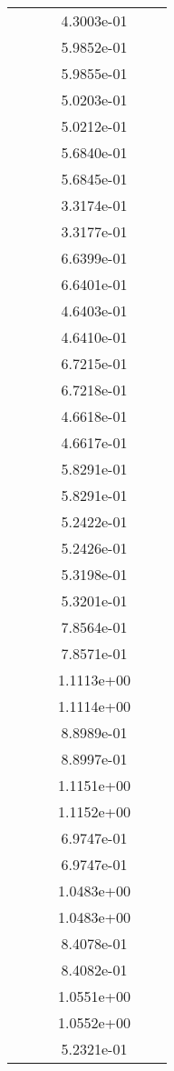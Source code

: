 \begin{xltabular}{\textwidth}{r|rS[table-format=1.3e+2]S[table-format=1.4e+2]S[table-format=1.4e+2]S[table-format=-1.5]}
&  &  & 4.3003e-01 & & \\
&  &  & 5.9852e-01 & & \\
&  &  & 5.9855e-01 & & \\
&  &  & 5.0203e-01 & & \\
&  &  & 5.0212e-01 & & \\
&  &  & 5.6840e-01 & & \\
&  &  & 5.6845e-01 & & \\
&  &  & 3.3174e-01 & & \\
&  &  & 3.3177e-01 & & \\
&  &  & 6.6399e-01 & & \\
&  &  & 6.6401e-01 & & \\
&  &  & 4.6403e-01 & & \\
&  &  & 4.6410e-01 & & \\
&  &  & 6.7215e-01 & & \\
&  &  & 6.7218e-01 & & \\
&  &  & 4.6618e-01 & & \\
&  &  & 4.6617e-01 & & \\
&  &  & 5.8291e-01 & & \\
&  &  & 5.8291e-01 & & \\
&  &  & 5.2422e-01 & & \\
&  &  & 5.2426e-01 & & \\
&  &  & 5.3198e-01 & & \\
&  &  & 5.3201e-01 & & \\
&  &  & 7.8564e-01 & & \\
&  &  & 7.8571e-01 & & \\
&  &  & 1.1113e+00 & & \\
&  &  & 1.1114e+00 & & \\
&  &  & 8.8989e-01 & & \\
&  &  & 8.8997e-01 & & \\
&  &  & 1.1151e+00 & & \\
&  &  & 1.1152e+00 & & \\
&  &  & 6.9747e-01 & & \\
&  &  & 6.9747e-01 & & \\
&  &  & 1.0483e+00 & & \\
&  &  & 1.0483e+00 & & \\
&  &  & 8.4078e-01 & & \\
&  &  & 8.4082e-01 & & \\
&  &  & 1.0551e+00 & & \\
&  &  & 1.0552e+00 & & \\
&  &  & 5.2321e-01 & & \\

\end{xltabular}
